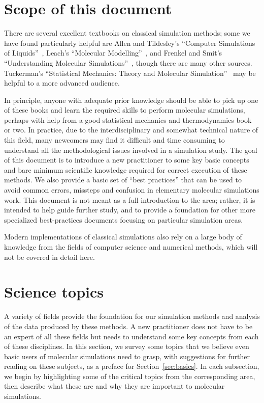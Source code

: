 \documentclass[9pt,bestpractices]{livecoms}
\begin{document}
\section{Scope of this document}
\label{sec:scope}

There are several excellent textbooks on classical simulation methods; some we have found particularly helpful are Allen and Tildesley's ``Computer Simulations of Liquids''~\cite{allen_computer_2017}, Leach's ``Molecular Modelling''~\cite{LeachBook}, and Frenkel and Smit's ``Understanding Molecular Simulations''~\cite{Frenkel:2001:}, though there are many other sources.
Tuckerman's ``Statistical Mechanics: Theory and Molecular Simulation''~\cite{Tuckerman:2010:} may be helpful to a more advanced audience.

In principle, anyone with adequate prior knowledge should be able to pick up one of these books and learn the required skills to perform molecular simulations, perhaps with help from a good statistical mechanics and thermodynamics book or two.
In practice, due to the interdisciplinary and somewhat technical nature of this field, many newcomers may find it difficult and time consuming to understand all the methodological issues involved in a simulation study.  
The goal of this document is to introduce a new practitioner to some key basic concepts and bare minimum scientific knowledge required for correct execution of these methods. 
We also provide a basic set of ``best practices'' that can be used to avoid common errors, missteps and confusion in elementary molecular simulations work.
This document is not meant as a full introduction to the area; rather, it is intended to help guide further study, and to provide a foundation for other more specialized best-practices documents focusing on particular simulation areas.

Modern implementations of classical simulations also rely on a large body of knowledge from the fields of computer science and numerical methods, which will
not be covered in detail here.


\section{Science topics}
\label{sec:science}
A variety of fields provide the foundation for our simulation methods and analysis of the data produced by these methods.
A new practitioner does not have to be an expert of all these fields but needs to understand some key concepts from each of these disciplines.
In this section, we survey some topics that we believe even basic users of molecular simulations need to grasp, with suggestions for further reading on these subjects, as a preface for Section~\ref{sec:basics}.
In each subsection, we begin by highlighting some of the critical topics from the corresponding area, then describe what these are and why they are important to molecular simulations.
\end{document}
